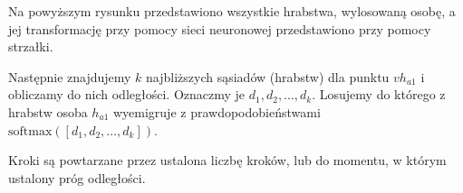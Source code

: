 \documentclass[a4paper,12pt]{article}
\newcommand{\softmax}{\mathrm{softmax}}
\begin{document}
Na powyższym rysunku przedstawiono wszystkie hrabstwa, wylosowaną osobę, a jej transformację przy pomocy sieci neuronowej przedstawiono przy pomocy strzałki.

Następnie znajdujemy $k$ najbliższych sąsiadów (hrabstw) dla punktu $vh_{a1}$ i obliczamy do nich odległości. Oznaczmy je $d_1, d_2, \dots, d_k$.
Losujemy do którego z hrabstw osoba $h_{a1}$ wyemigruje z prawdopodobieństwami $\softmax ([d_1, d_2, \dots, d_k])$.

Kroki są powtarzane przez ustalona liczbę kroków, lub do momentu, w którym ustalony próg odległości.

\newpage
\printbibliography[title=Bibliografia]
\end{document}
